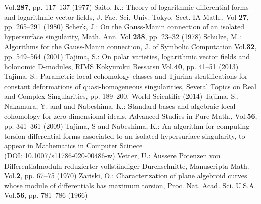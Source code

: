 \documentclass{arxsigma}
\begin{document}
\begin{thebibliography}{99}
Vol.{\bf 287}, pp. 117--137 (1977)
Saito, K.:
\newblock Theory of logarithmic differential forms and logarithmic vector fields,
\newblock J. Fac. Sci. Univ. Tokyo, Sect. IA Math.,
Vol \textbf{27}, pp. 265--291 (1980)
Scherk, J.:
\newblock On the Gauss-Manin connection of an isolated hypersurface singularity,
\newblock Math. Ann.
Vol.{\bf 238}, pp. 23--32 (1978)
Schulze, M.:
\newblock Algorithms for the Gauss-Manin connection,
\newblock J. of Symbolic Computation
Vol.{\bf 32}, pp. 549--564 (2001)
Tajima, S.:
\newblock
On polar varieties, logarithmic vector fields and holonomic D-modules,
\newblock RIMS Kokyuroku Bessatsu
Vol.{\bf 40}, pp.
41--51 (2013)
Tajima, S.:
\newblock Parametric local cohomology classes and Tjurina stratifications for  -constant deformations of
quasi-homogeneous singularities,
\newblock Several Topics on Real and Complex Singularities,
pp. 189--200, World Scientific (2014)
Tajima, S., Nakamura, Y. and
and Nabeshima, K.:
\newblock Standard bases and algebraic local cohomology for zero dimensional ideals,
\newblock Advanced Studies in Pure Math.,
Vol.{\bf 56}, pp. 341--361 (2009)
Tajima, S
and Nabeshima, K.:
\newblock An algorithm for computing torsion differential forms associated to
an isolated hypersurface singularity,
\newblock to appear in Mathematics in Computer Scinece \\ (DOI: 10.1007/s11786-020-00486-w)
Vetter, U.:
\newblock \"Aussere Potenzen von Differentialmoduln reduzierter vollst\"andiger Durchschnitte,
\newblock Manuscripta Math.
Vol.{\bf 2}, pp. 67--75 (1970)
Zariski, O.:
\newblock Characterization of plane algebroid curves whose module of differentials has maximum torsion,
\newblock Proc. Nat. Acad. Sci. U.S.A.
Vol.{\bf 56}, pp. 781--786 (1966)
\end{thebibliography}\LastPageEnding
\end{document}
